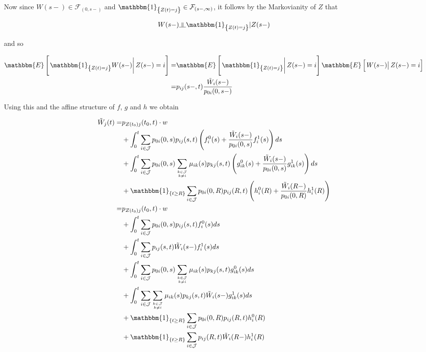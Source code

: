 \documentclass{article}
\newcommand{\indep}{\rotatebox[origin=c]{90}{$\models$}}
\newcommand{\1}[1]{\mathbbm{1}_{\left\lbrace #1 \right\rbrace}}
\newcommand{\econd}[2][def]{\mathbbm{E} \left[ \left. #1 \right| #2 \right]}
\theoremstyle{break}
\theoremstyle{remark}
\numberwithin{equation}{section}
\begin{document}
\begin{appendices}
Now since $W(s-) \in  \mathcal{F}_{\left( 0,s- \right)}$ and $\1{Z(t)=j} \in \mathcal{F}_{\left( s-,\infty \right)}$, it follows by the Markovianity of $Z$ that

\begin{align*}
	W(s-) \indep \1{Z(t)=j} | Z(s-)
\end{align*}

and so

\begin{align*}
	\econd[\1{Z(t)=j}W(s-)]{Z(s-)=i} =& \econd[\1{Z(t)=j}]{Z(s-)=i} \econd[W(s-)]{Z(s-)=i} \\
	=& p_{ij}(s-,t) \frac{\tilde{W}_i(s-)}{p_{0i}(0,s-)}
\end{align*}


Using this and the affine structure of $f$, $g$ and $h$ we obtain

\begin{align}
\tilde{W}_j(t) =& p_{Z(t_0)j}(t_0,t) \cdot w \\
&+ \int_0^t \sum_{i \in \mathcal{J}} p_{0i}(0,s) p_{ij}(s,t) \left( f_i^0(s) + \frac{\tilde{W}_i(s-)}{p_{0i}(0,s)} f_i^1(s) \right) ds \\
&+ \int_0^t \sum_{i \in \mathcal{J}} p_{0i}(0,s) \sum_{k \in \mathcal{J} \atop k \neq i} \mu_{ik}(s) p_{kj}(s,t) \left( g_{ik}^0(s) + \frac{\tilde{W}_i(s-)}{p_{0i}(0,s)} g_{ik}^1(s) \right) ds \\
&+ \1{t \geq R}\sum_{i \in \mathcal{J}} p_{0i}(0,R) p_{ij}(R,t) \left( h_i^0(R) + \frac{\tilde{W}_i(R-)}{p_{0i}(0,R)} h_i^1(R) \right) \\
=& p_{Z(t_0)j}(t_0,t) \cdot w \label{FirstLineA} \\
&+ \int_0^t \sum_{i \in \mathcal{J}} p_{0i}(0,s) p_{ij}(s,t) f_i^0(s) ds \\
&+ \int_0^t \sum_{i \in \mathcal{J}} p_{ij}(s,t) \tilde{W}_i(s-) f_i^1(s) ds \\
&+ \int_0^t \sum_{i \in \mathcal{J}} p_{0i}(0,s) \sum_{k \in \mathcal{J} \atop k \neq i} \mu_{ik}(s) p_{kj}(s,t) g_{ik}^0(s) ds \\
&+ \int_0^t \sum_{i \in \mathcal{J}} \sum_{k \in \mathcal{J} \atop k \neq i} \mu_{ik}(s) p_{kj}(s,t) \tilde{W}_i(s-) g_{ik}^1(s) ds \\
&+ \1{t \geq R}\sum_{i \in \mathcal{J}} p_{0i}(0,R) p_{ij}(R,t) h_i^0(R) \label{FirstGlue} \\
&+ \1{t \geq R}\sum_{i \in \mathcal{J}} p_{ij}(R,t) \tilde{W}_i(R-) h_i^1(R) \label{SecondGlue}
\end{align}


\end{appendices}
\end{document}

